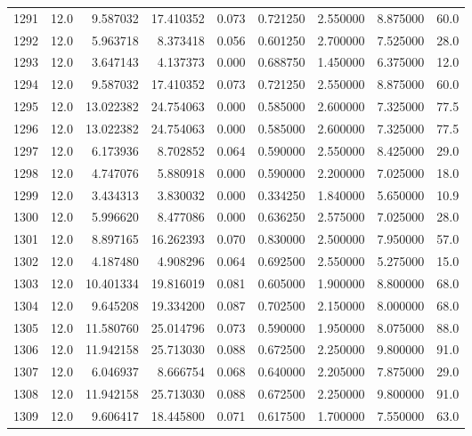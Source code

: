 \begin{tabular}{lrrrrrrrr}
1291 &   12.0 &   9.587032 &  17.410352 &  0.073 &  0.721250 &  2.550000 &   8.875000 &   60.0 \\
1292 &   12.0 &   5.963718 &   8.373418 &  0.056 &  0.601250 &  2.700000 &   7.525000 &   28.0 \\
1293 &   12.0 &   3.647143 &   4.137373 &  0.000 &  0.688750 &  1.450000 &   6.375000 &   12.0 \\
1294 &   12.0 &   9.587032 &  17.410352 &  0.073 &  0.721250 &  2.550000 &   8.875000 &   60.0 \\
1295 &   12.0 &  13.022382 &  24.754063 &  0.000 &  0.585000 &  2.600000 &   7.325000 &   77.5 \\
1296 &   12.0 &  13.022382 &  24.754063 &  0.000 &  0.585000 &  2.600000 &   7.325000 &   77.5 \\
1297 &   12.0 &   6.173936 &   8.702852 &  0.064 &  0.590000 &  2.550000 &   8.425000 &   29.0 \\
1298 &   12.0 &   4.747076 &   5.880918 &  0.000 &  0.590000 &  2.200000 &   7.025000 &   18.0 \\
1299 &   12.0 &   3.434313 &   3.830032 &  0.000 &  0.334250 &  1.840000 &   5.650000 &   10.9 \\
1300 &   12.0 &   5.996620 &   8.477086 &  0.000 &  0.636250 &  2.575000 &   7.025000 &   28.0 \\
1301 &   12.0 &   8.897165 &  16.262393 &  0.070 &  0.830000 &  2.500000 &   7.950000 &   57.0 \\
1302 &   12.0 &   4.187480 &   4.908296 &  0.064 &  0.692500 &  2.550000 &   5.275000 &   15.0 \\
1303 &   12.0 &  10.401334 &  19.816019 &  0.081 &  0.605000 &  1.900000 &   8.800000 &   68.0 \\
1304 &   12.0 &   9.645208 &  19.334200 &  0.087 &  0.702500 &  2.150000 &   8.000000 &   68.0 \\
1305 &   12.0 &  11.580760 &  25.014796 &  0.073 &  0.590000 &  1.950000 &   8.075000 &   88.0 \\
1306 &   12.0 &  11.942158 &  25.713030 &  0.088 &  0.672500 &  2.250000 &   9.800000 &   91.0 \\
1307 &   12.0 &   6.046937 &   8.666754 &  0.068 &  0.640000 &  2.205000 &   7.875000 &   29.0 \\
1308 &   12.0 &  11.942158 &  25.713030 &  0.088 &  0.672500 &  2.250000 &   9.800000 &   91.0 \\
1309 &   12.0 &   9.606417 &  18.445800 &  0.071 &  0.617500 &  1.700000 &   7.550000 &   63.0 \\

\end{tabular}
